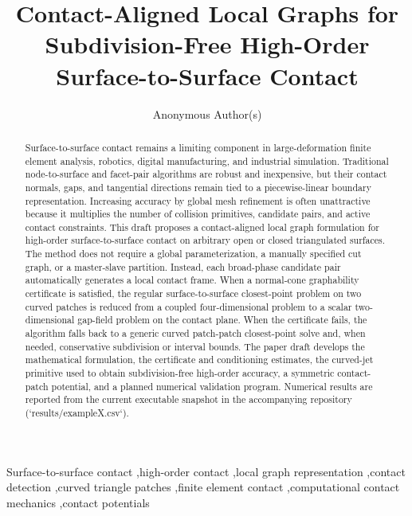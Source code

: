 \documentclass[preprint,12pt]{elsarticle}
\begin{document}
\begin{frontmatter}

\title{Contact-Aligned Local Graphs for Subdivision-Free High-Order Surface-to-Surface Contact}

\author[inst1]{Anonymous Author(s)}
\address[inst1]{Manuscript prepared for submission to Computer Methods in Applied Mechanics and Engineering}

\begin{abstract}
Surface-to-surface contact remains a limiting component in large-deformation finite element analysis, robotics, digital manufacturing, and industrial simulation. Traditional node-to-surface and facet-pair algorithms are robust and inexpensive, but their contact normals, gaps, and tangential directions remain tied to a piecewise-linear boundary representation. Increasing accuracy by global mesh refinement is often unattractive because it multiplies the number of collision primitives, candidate pairs, and active contact constraints. This draft proposes a contact-aligned local graph formulation for high-order surface-to-surface contact on arbitrary open or closed triangulated surfaces. The method does not require a global parameterization, a manually specified cut graph, or a master-slave partition. Instead, each broad-phase candidate pair automatically generates a local contact frame. When a normal-cone graphability certificate is satisfied, the regular surface-to-surface closest-point problem on two curved patches is reduced from a coupled four-dimensional problem to a scalar two-dimensional gap-field problem on the contact plane. When the certificate fails, the algorithm falls back to a generic curved patch-patch closest-point solve and, when needed, conservative subdivision or interval bounds. The paper draft develops the mathematical formulation, the certificate and conditioning estimates, the curved-jet primitive used to obtain subdivision-free high-order accuracy, a symmetric contact-patch potential, and a planned numerical validation program. Numerical results are reported from the current executable snapshot in the accompanying repository (`results/exampleX.csv`).
\end{abstract}

\begin{keyword}
Surface-to-surface contact \sep high-order contact \sep local graph representation \sep contact detection \sep curved triangle patches \sep finite element contact \sep computational contact mechanics \sep contact potentials
\end{keyword}

\end{frontmatter}
\end{document}
